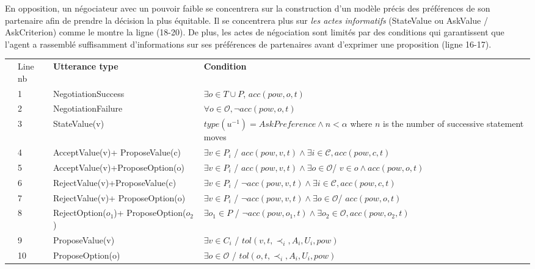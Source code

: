 \documentclass [french]{sig-alternate-05-2015}
\begin{document}
		En opposition, un négociateur avec un pouvoir faible se concentrera sur la construction d'un modèle précis des préférences de son partenaire afin de prendre la décision la plus équitable. Il se concentrera plus sur \emph {les actes informatifs} (StateValue ou AskValue / AskCriterion) comme le montre la ligne (18-20). De plus, les actes de négociation sont limités par des conditions qui garantissent que l'agent a rassemblé suffisamment d'informations sur ses préférences de partenaires avant d'exprimer une proposition (ligne 16-17).
			\begin{table}[!t]
				{%
					\centering
					\begin{tabular}{|p{.3cm}|p{.6cm}|p{3cm}|p{7.5cm}|}
						\hline
						\parbox[t]{2mm}{}&Line nb& \textbf{Utterance type} & \textbf{Condition} \\
						&1&NegotiationSuccess & $\exists o \in T\cup P$, $acc(pow,o,t)$ \\
						& 2& NegotiationFailure & $ \forall o \in \mathcal{O},  \neg acc(pow,o,t)$\\
						&3& StateValue(v) & $type(u^{-1}) = AskPreference \land n < \alpha$ \newline where $n$ is the number of successive statement moves\\
						&4& AcceptValue(v)+ \newline ProposeValue(c) & $ \exists v \in P_i$ / $acc(pow,v,t) \land \exists i\in\mathcal{C}, acc(pow,c,t)$ \\
						&5& AcceptValue(v)+\newline ProposeOption(o) &  $ \exists v \in P_i$ / $ acc(pow,v,t) \land \exists o \in \mathcal{O}$/ $ v \in o \land acc(pow,o,t)$ \\
						&6& RejectValue(v)+\newline ProposeValue(c) & $ \exists v \in P_i$ / $ \neg acc(pow,v,t) \land \exists i\in\mathcal{C}, acc(pow,c,t)$ \\
						&7& RejectValue(v)+ \newline ProposeOption(o) &  $ \exists v \in P_i$ / $  \neg acc(pow,v,t) \land \exists o \in \mathcal{O}$/ $acc(pow,o,t)$ \\
						& 8&RejectOption($o_1$)+ ProposeOption($o_2$) & $ \exists o_1 \in P$ / $ \neg acc(pow,o_1,t) \land \exists o_2\in\mathcal{O}, acc(pow,o_2,t)$ \\
						&9& ProposeValue(v) & $\exists v \in C_i$ / $tol(v, t, \prec_i, A_i, U_i, pow)$\\
						&10& ProposeOption(o) & $\exists o \in \mathcal{O}$ / $tol(o, t, \prec_i, A_i, U_i, pow)$\\
						

\end{tabular}}
\end{table}
\end{document}
